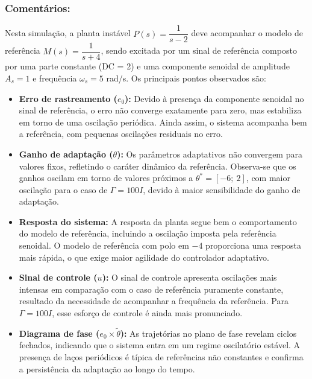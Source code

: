 \documentclass[10pt]{article}
\begin{document}
\subsubsection{Comentários:}

Nesta simulação, a planta instável $P(s) = \dfrac{1}{s - 2}$ deve acompanhar o modelo de referência $M(s) = \dfrac{1}{s + 4}$, sendo excitada por um sinal de referência composto por uma parte constante (DC = 2) e uma componente senoidal de amplitude $A_s = 1$ e frequência $\omega_s = 5$ rad/s. Os principais pontos observados são:

\begin{itemize}
    \item \textbf{Erro de rastreamento ($e_0$):} Devido à presença da componente senoidal no sinal de referência, o erro não converge exatamente para zero, mas estabiliza em torno de uma oscilação periódica. Ainda assim, o sistema acompanha bem a referência, com pequenas oscilações residuais no erro.

    \item \textbf{Ganho de adaptação ($\theta$):} Os parâmetros adaptativos não convergem para valores fixos, refletindo o caráter dinâmico da referência. Observa-se que os ganhos oscilam em torno de valores próximos a $\theta^* = [-6;\ 2]$, com maior oscilação para o caso de $\Gamma = 100I$, devido à maior sensibilidade do ganho de adaptação.

    \item \textbf{Resposta do sistema:} A resposta da planta segue bem o comportamento do modelo de referência, incluindo a oscilação imposta pela referência senoidal. O modelo de referência com polo em $-4$ proporciona uma resposta mais rápida, o que exige maior agilidade do controlador adaptativo.

    \item \textbf{Sinal de controle ($u$):} O sinal de controle apresenta oscilações mais intensas em comparação com o caso de referência puramente constante, resultado da necessidade de acompanhar a frequência da referência. Para $\Gamma = 100I$, esse esforço de controle é ainda mais pronunciado.

    \item \textbf{Diagrama de fase ($e_0 \times \tilde{\theta}$):} As trajetórias no plano de fase revelam ciclos fechados, indicando que o sistema entra em um regime oscilatório estável. A presença de laços periódicos é típica de referências não constantes e confirma a persistência da adaptação ao longo do tempo.
\end{itemize}
\end{document}
